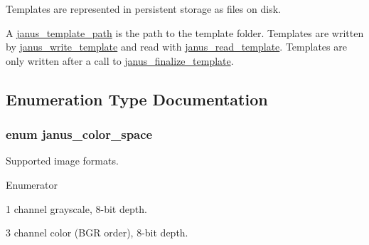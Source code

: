 Templates are represented in persistent storage as files on disk. 

A \hyperlink{group__janus_gad1ec012594c24085ba7110ad96a2db22}{janus\+\_\+template\+\_\+path} is the path to the template folder. Templates are written by \hyperlink{group__janus_gaca62ac60aaa785c0a9134d980d1cb507}{janus\+\_\+write\+\_\+template} and read with \hyperlink{group__janus_ga814335abf8d450912b1f99fadc15b7aa}{janus\+\_\+read\+\_\+template}. Templates are only written after a call to \hyperlink{group__janus_ga8866f19be5375a9139ce8a20b9af45b2}{janus\+\_\+finalize\+\_\+template}. 

\subsection{Enumeration Type Documentation}
\hypertarget{group__janus_gac189bebcbab53c752990509cb48ccd4c}{}
\subsubsection[{janus\+\_\+color\+\_\+space}]{\setlength{\rightskip}{0pt plus 5cm}enum {\bf janus\+\_\+color\+\_\+space}}\label{group__janus_gac189bebcbab53c752990509cb48ccd4c}


Supported image formats. 

\begin{Desc}
\item[Enumerator]\par
\begin{description}
\item[{\em 
\hypertarget{group__janus_ggac189bebcbab53c752990509cb48ccd4ca6914ab831ea319e4837d0aed95cc9f45}{}J\+A\+N\+U\+S\+\_\+\+G\+R\+A\+Y8\label{group__janus_ggac189bebcbab53c752990509cb48ccd4ca6914ab831ea319e4837d0aed95cc9f45}
}]1 channel grayscale, 8-\/bit depth. \item[{\em 
\hypertarget{group__janus_ggac189bebcbab53c752990509cb48ccd4ca5755eebe0c5461a890145a0ad5d68a7c}{}J\+A\+N\+U\+S\+\_\+\+B\+G\+R24\label{group__janus_ggac189bebcbab53c752990509cb48ccd4ca5755eebe0c5461a890145a0ad5d68a7c}
}]3 channel color (B\+G\+R order), 8-\/bit depth. \end{description}
\end{Desc}
\hypertarget{group__janus_ga1b275e4dade484951b366f785597b8f6}{}
